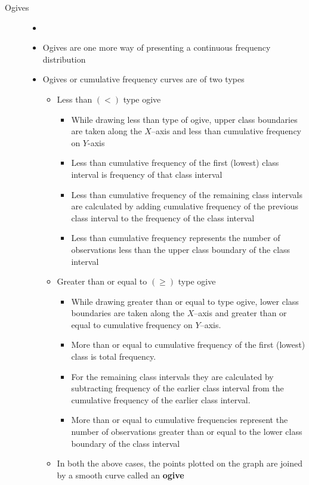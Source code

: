 \documentclass[
10pt, %
a4paper, %
]{report}
\begin{document}
\begin{description}
\item[Ogives]
\begin{itemize}
\item[]
\item Ogives are one more way of presenting a
continuous frequency distribution
\item Ogives or cumulative frequency curves are of two types
\begin{itemize}
\item Less than \((<)\) type ogive
\begin{itemize}
\item While drawing less than type of ogive, upper class boundaries are taken along the \(X\)–axis and less than cumulative frequency on \(Y\)-axis
\item Less than cumulative frequency of the first (lowest) class interval is frequency of that class interval
\item Less than cumulative frequency of the remaining class intervals are calculated by adding cumulative frequency of the previous class interval to the frequency of the class interval
\item Less than cumulative frequency represents the number of observations less than the upper class boundary of the class interval
\end{itemize}
\item Greater than or equal to \((\ge)\) type ogive
\begin{itemize}
\item While drawing greater than or equal to type ogive, lower class boundaries are taken along the \(X\)–axis and greater than or equal to cumulative frequency on \(Y\)–axis.
\item More than or equal to cumulative frequency of the first (lowest) class is total frequency.
\item For the remaining class intervals they are calculated by subtracting frequency of the earlier class interval from the cumulative frequency of the earlier class interval.
\item More than or equal to cumulative frequencies represent the number of observations greater than or equal to the lower class
boundary of the class interval
\end{itemize}
\item In both the above cases, the points plotted on the graph are joined by a smooth curve called an \textbf{ogive}
\end{itemize}
\end{itemize}
\end{description}
\end{document}
